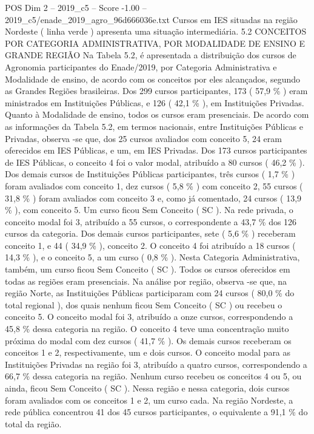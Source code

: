 \begin{textsample}{POS Dim 2 – 2019\_c5 – Score -1.00 – 2019\_c5/enade\_2019\_agro\_96d666036e.txt}
Cursos em IES situadas na região Nordeste ( linha verde ) apresenta uma situação intermediária. 5.2 CONCEITOS POR CATEGORIA ADMINISTRATIVA, POR MODALIDADE DE ENSINO E GRANDE REGIÃO Na Tabela 5.2, é apresentada a distribuição dos cursos de Agronomia participantes do Enade/2019, por Categoria Administrativa e Modalidade de ensino, de acordo com os conceitos por eles alcançados, segundo as Grandes Regiões brasileiras.
Dos 299 cursos participantes, 173 ( 57,9 \% ) eram ministrados em Instituições Públicas, e 126 ( 42,1 \% ), em Instituições Privadas.
Quanto à Modalidade de ensino, todos os cursos eram presenciais.
De acordo com as informações da Tabela 5.2, em termos nacionais, entre Instituições Públicas e Privadas, observa -se que, dos 25 cursos avaliados com conceito 5, 24 eram oferecidos em IES Públicas, e um, em IES Privadas.
Dos 173 cursos participantes de IES Públicas, o conceito 4 foi o valor modal, atribuído a 80 cursos ( 46,2 \% ).
Dos demais cursos de Instituições Públicas participantes, três cursos ( 1,7 \% ) foram avaliados com conceito 1, dez cursos ( 5,8 \% ) com conceito 2, 55 cursos ( 31,8 \% ) foram avaliados com conceito 3 e, como já comentado, 24 cursos ( 13,9 \% ), com conceito 5.
Um curso ficou Sem Conceito ( SC ).
Na rede privada, o conceito modal foi 3, atribuído a 55 cursos, o correspondente a 43,7 \% dos 126 cursos da categoria.
Dos demais cursos participantes, sete ( 5,6 \% ) receberam conceito 1, e 44 ( 34,9 \% ), conceito 2.
O conceito 4 foi atribuído a 18 cursos ( 14,3 \% ), e o conceito 5, a um curso ( 0,8 \% ).
Nesta Categoria Administrativa, também, um curso ficou Sem Conceito ( SC ).
Todos os cursos oferecidos em todas as regiões eram presenciais.
Na análise por região, observa -se que, na região Norte, as Instituições Públicas participaram com 24 cursos ( 80,0 \% do total regional ), dos quais nenhum ficou Sem Conceito ( SC ) ou recebeu o conceito 5.
O conceito modal foi 3, atribuído a onze cursos, correspondendo a 45,8 \% dessa categoria na região.
O conceito 4 teve uma concentração muito próxima do modal com dez cursos ( 41,7 \% ).
Os demais cursos receberam os conceitos 1 e 2, respectivamente, um e dois cursos.
O conceito modal para as Instituições Privadas na região foi 3, atribuído a quatro cursos, correspondendo a 66,7 \% dessa categoria na região.
Nenhum curso recebeu os conceitos 4 ou 5, ou ainda, ficou Sem Conceito ( SC ).
Nessa região e nessa categoria, dois cursos foram avaliados com os conceitos 1 e 2, um curso cada.
Na região Nordeste, a rede pública concentrou 41 dos 45 cursos participantes, o equivalente a 91,1 \% do total da região.

\end{textsample}
